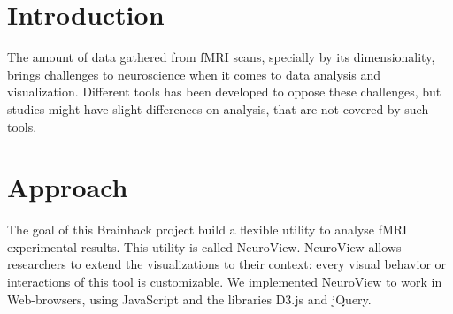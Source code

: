 \documentclass[twocolumn]{bmcart}%
\begin{document}
\begin{frontmatter}
\begin{fmbox}

	








%
\end{fmbox}%

\end{frontmatter}


\section{Introduction}\label{introduction}

The amount of data gathered from fMRI scans, specially by its
dimensionality, brings challenges to neuroscience when it comes to data
analysis and visualization. Different tools has been developed to oppose
these challenges, but studies might have slight differences on analysis,
that are not covered by such tools.

\section{Approach}\label{approach}

The goal of this Brainhack project build a flexible utility to analyse
fMRI experimental results. This utility is called NeuroView. NeuroView
allows researchers to extend the visualizations to their context: every
visual behavior or interactions of this tool is customizable. We
implemented NeuroView to work in Web-browsers, using JavaScript and the
libraries D3.js and jQuery.
\end{document}
